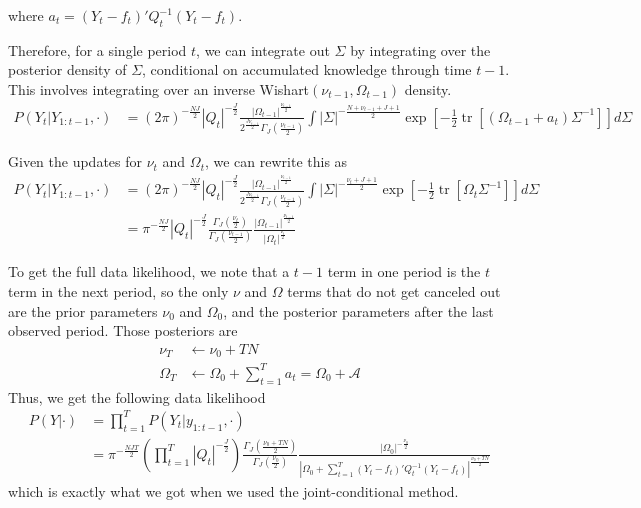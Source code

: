 \documentclass[letter,10pt]{article}
\DeclareMathOperator\tr{tr}
\newcommand{\A}{\mathcal{A}}
\begin{document}
where $a_t=\left(Y_t-f_t\right)
        'Q_t^{-1}\left(Y_t-f_t\right)$.

Therefore, for a single period $t$, we can integrate out $\Sigma$ by
integrating over the posterior density of $\Sigma$, conditional on
accumulated knowledge through time $t-1$.  This involves integrating
over an inverse Wishart$(\nu_{t-1},\Omega_{t-1})$ density.
\begin{align}
  \label{eq:7}
  P(Y_t|Y_{1:t-1},\cdot)&=
\left(
    2\pi\right)^{-\frac{NJ}{2}}|Q_t|^{-\frac{J}{2}}\frac{|\Omega_{t-1}|^{\frac{\nu_{t-1}}{2}}}{2^{\frac{J\nu_{t-1}}{2}}\Gamma_J\left(\frac{\nu_{t-1}}{2}\right)}\int |\Sigma|^{-\frac{N+\nu_{t-1}+J+1}{2}}\exp\left[-\frac{1}{2}\tr\left[\left(\Omega_{t-1}+a_t\right)\Sigma^{-1}\right]\right] d\Sigma
\end{align}

Given the updates for $\nu_t$ and $\Omega_t$, we can rewrite this as
\begin{align}
  \label{eq:8}
    P(Y_t|Y_{1:t-1},\cdot)&=
\left(
    2\pi\right)^{-\frac{NJ}{2}}|Q_t|^{-\frac{J}{2}}\frac{|\Omega_{t-1}|^{\frac{\nu_{t-1}}{2}}}{2^{\frac{J\nu_{t-1}}{2}}\Gamma_J\left(\frac{\nu_{t-1}}{2}\right)}\int
  |\Sigma|^{-\frac{\nu_t+J+1}{2}}\exp\left[-\frac{1}{2}\tr\left[\Omega_t\Sigma^{-1}\right]\right]
  d\Sigma\\
&=\pi^{-\frac{NJ}{2}}|Q_t|^{-\frac{J}{2}}\frac{\Gamma_J\left(\frac{\nu_t}{2}\right)}{\Gamma_J\left(\frac{\nu_{t-1}}{2}\right)}\frac{|\Omega_{t-1}|^{\frac{\nu_{t-1}}{2}}}{|\Omega_t|^{\frac{\nu_t}{2}}}
\end{align}

To get the full data likelihood, we note that a $t-1$ term in one
period is the $t$ term in the next period, so the only $\nu$ and
$\Omega$ terms that do not get canceled out are the prior parameters
$\nu_0$ and $\Omega_0$, and the posterior parameters after the last
observed period.  Those posteriors are
\begin{align}
  \label{eq:10}
\nu_T&\leftarrow\nu_0+TN\\
  \Omega_T&\leftarrow\Omega_0+\sum_{t=1}^Ta_t=\Omega_0+\A
\end{align}
Thus, we get the following data likelihood
\begin{align}
  \label{eq:9}
  P(Y|\cdot)&=\prod_{t=1}^TP(Y_t|y_{1:t-1},\cdot)\\
&=\pi^{-\frac{NJT}{2}}\left(\prod_{t=1}^T|Q_t|^{-\frac{J}{2}}\right)\frac{\Gamma_J\left(\frac{\nu_0+TN}{2}\right)}{\Gamma_J\left(\frac{\nu_0}{2}\right)}\frac{|\Omega_0|^{-\frac{\nu_0}{2}}}{|\Omega_0+\sum_{t=1}^T\left(Y_t-f_t\right)'Q_t^{-1}\left(Y_t-f_t\right)|^{\frac{\nu_0+TN}{2}}}
\end{align}
which is exactly what we got when we used the joint-conditional method.
\end{document}

